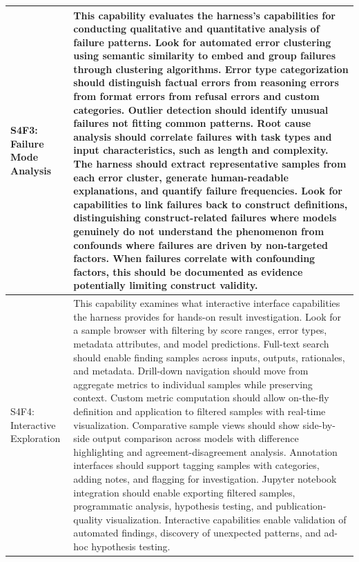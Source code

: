 \begin{longtable}{>{\raggedright\arraybackslash}p{3cm}|>{\raggedright\arraybackslash}p{16cm}}
S4F3: Failure Mode Analysis & This capability evaluates the harness's capabilities for conducting qualitative and quantitative analysis of failure patterns. Look for automated error clustering using semantic similarity to embed and group failures through clustering algorithms. Error type categorization should distinguish factual errors from reasoning errors from format errors from refusal errors and custom categories. Outlier detection should identify unusual failures not fitting common patterns. Root cause analysis should correlate failures with task types and input characteristics, such as length and complexity. The harness should extract representative samples from each error cluster, generate human-readable explanations, and quantify failure frequencies. Look for capabilities to link failures back to construct definitions, distinguishing construct-related failures where models genuinely do not understand the phenomenon from confounds where failures are driven by non-targeted factors. When failures correlate with confounding factors, this should be documented as evidence potentially limiting construct validity. \\
\hline

S4F4: Interactive Exploration & This capability examines what interactive interface capabilities the harness provides for hands-on result investigation. Look for a sample browser with filtering by score ranges, error types, metadata attributes, and model predictions. Full-text search should enable finding samples across inputs, outputs, rationales, and metadata. Drill-down navigation should move from aggregate metrics to individual samples while preserving context. Custom metric computation should allow on-the-fly definition and application to filtered samples with real-time visualization. Comparative sample views should show side-by-side output comparison across models with difference highlighting and agreement-disagreement analysis. Annotation interfaces should support tagging samples with categories, adding notes, and flagging for investigation. Jupyter notebook integration should enable exporting filtered samples, programmatic analysis, hypothesis testing, and publication-quality visualization. Interactive capabilities enable validation of automated findings, discovery of unexpected patterns, and ad-hoc hypothesis testing. \\
\hline


\end{longtable}

